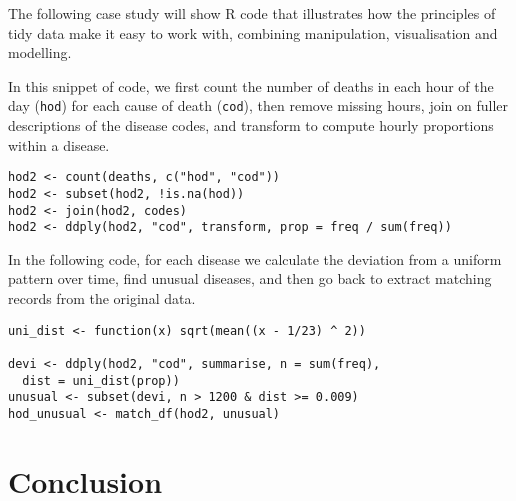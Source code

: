 \documentclass[oneside]{article}
\begin{document}
The following case study will show R code that illustrates how the principles of tidy data make it easy to work with, combining manipulation, visualisation and modelling.

In this snippet of code, we first count the number of deaths in each hour of the day ({\tt hod}) for each cause of death ({\tt cod}), then remove missing hours, join on fuller descriptions of the disease codes, and transform to compute hourly proportions within a disease.

\begin{verbatim}
hod2 <- count(deaths, c("hod", "cod"))
hod2 <- subset(hod2, !is.na(hod))
hod2 <- join(hod2, codes)
hod2 <- ddply(hod2, "cod", transform, prop = freq / sum(freq))
\end{verbatim}

In the following code, for each disease we calculate the deviation from a uniform pattern over time, find unusual diseases, and then go back to extract matching records from the original data.

\begin{verbatim}
uni_dist <- function(x) sqrt(mean((x - 1/23) ^ 2))

devi <- ddply(hod2, "cod", summarise, n = sum(freq), 
  dist = uni_dist(prop))
unusual <- subset(devi, n > 1200 & dist >= 0.009)
hod_unusual <- match_df(hod2, unusual)
\end{verbatim}

\section{Conclusion}


\end{document}

